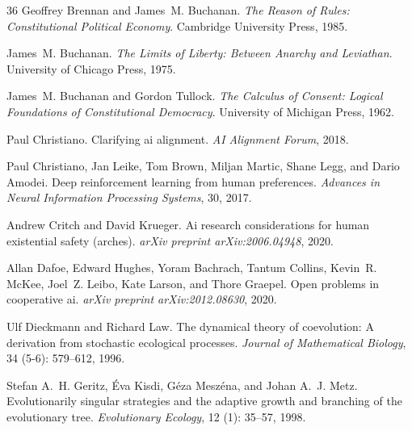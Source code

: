 \documentclass[12pt]{article}
\begin{document}
\begin{thebibliography}{36}
Geoffrey Brennan and James~M. Buchanan.
\newblock \emph{The Reason of Rules: Constitutional Political Economy}.
\newblock Cambridge University Press, 1985.

James~M. Buchanan.
\newblock \emph{The Limits of Liberty: Between Anarchy and Leviathan}.
\newblock University of Chicago Press, 1975.

James~M. Buchanan and Gordon Tullock.
\newblock \emph{The Calculus of Consent: Logical Foundations of Constitutional
  Democracy}.
\newblock University of Michigan Press, 1962.

Paul Christiano.
\newblock Clarifying ai alignment.
\newblock \emph{AI Alignment Forum}, 2018.

Paul Christiano, Jan Leike, Tom Brown, Miljan Martic, Shane Legg, and Dario
  Amodei.
\newblock Deep reinforcement learning from human preferences.
\newblock \emph{Advances in Neural Information Processing Systems}, 30, 2017.

Andrew Critch and David Krueger.
\newblock Ai research considerations for human existential safety (arches).
\newblock \emph{arXiv preprint arXiv:2006.04948}, 2020.

Allan Dafoe, Edward Hughes, Yoram Bachrach, Tantum Collins, Kevin~R. McKee,
  Joel~Z. Leibo, Kate Larson, and Thore Graepel.
\newblock Open problems in cooperative ai.
\newblock \emph{arXiv preprint arXiv:2012.08630}, 2020.

Ulf Dieckmann and Richard Law.
\newblock The dynamical theory of coevolution: A derivation from stochastic
  ecological processes.
\newblock \emph{Journal of Mathematical Biology}, 34 (5-6):
  579--612, 1996.

Stefan A.~H. Geritz, {\'E}va Kisdi, G{\'e}za Mesz{\'e}na, and Johan A.~J. Metz.
\newblock Evolutionarily singular strategies and the adaptive growth and
  branching of the evolutionary tree.
\newblock \emph{Evolutionary Ecology}, 12 (1): 35--57, 1998.


\end{thebibliography}
\end{document}

